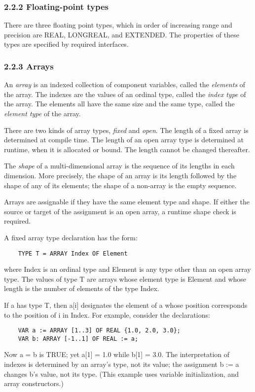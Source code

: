 \documentclass[10pt]{article}
\begin{document}
\subsubsection*{2.2.2 Floating-point types}

There are three floating point types, which in order of increasing range and
precision are REAL, LONGREAL, and EXTENDED.  The properties of these types are
specified by required interfaces.

\subsubsection*{2.2.3 Arrays}

An \emph{array} is an indexed collection of component variables, called the
\emph{elements} of the array.  The indexes are the values of an ordinal type,
called the \emph{index type} of the array.  The elements all have the same
size and the same type, called the \emph{element type} of the array.

There are two kinds of array types, \emph{fixed} and \emph{open}.  The length
of a fixed array is determined at compile time.  The length of an open array
type is determined at runtime, when it is allocated or bound.  The length
cannot be changed thereafter.

The \emph{shape} of a multi-dimensional array is the sequence of its lengths
in each dimension.  More precisely, the shape of an array is its length
followed by the shape of any of its elements; the shape of a non-array is the
empty sequence.

Arrays are assignable if they have the same element type and shape.  If either
the source or target of the assignment is an open array, a runtime shape check
is required.

A fixed array type declaration has the form:
\begin{verbatim}
    TYPE T = ARRAY Index OF Element
\end{verbatim}
where Index is an ordinal type and Element is any type other than an open
array type.  The values of type T are arrays whose element type is Element and
whose length is the number of elements of the type Index.

If a has type T, then a[i] designates the element of a whose position
corresponds to the position of i in Index.  For example, consider the
declarations:
\begin{verbatim}
    VAR a := ARRAY [1..3] OF REAL {1.0, 2.0, 3.0};
    VAR b: ARRAY [-1..1] OF REAL := a;
\end{verbatim}
Now a = b is TRUE; yet a[1] = 1.0 while b[1] = 3.0.  The interpretation of
indexes is determined by an array's type, not its value; the assignment b := a
changes b's value, not its type.  (This example uses variable initialization,
and array constructors.)
\end{document}
